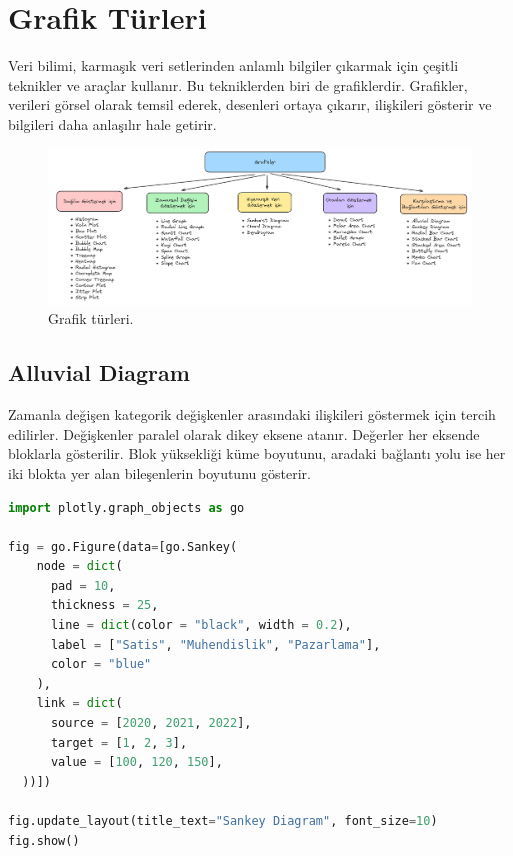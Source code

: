 \section{Grafik Türleri}
Veri bilimi, karmaşık veri setlerinden anlamlı bilgiler çıkarmak için çeşitli teknikler ve araçlar kullanır. Bu tekniklerden biri de grafiklerdir. Grafikler, verileri görsel olarak temsil ederek, desenleri ortaya çıkarır, ilişkileri gösterir ve bilgileri daha anlaşılır hale getirir.

\begin{figure}[h]
    \centering
    \includegraphics[width=1\textwidth]{images/graph_types.png}
    \caption{Grafik türleri.}
    \label{fig:enter-label}
\end{figure}

\newpage

\subsection{Alluvial Diagram}
Zamanla değişen kategorik değişkenler arasındaki ilişkileri göstermek için tercih edilirler. Değişkenler paralel olarak dikey eksene atanır. Değerler her eksende bloklarla gösterilir. Blok yüksekliği küme boyutunu, aradaki bağlantı yolu ise her iki blokta yer alan bileşenlerin boyutunu gösterir.

\begin{lstlisting}[language=Python]
import plotly.graph_objects as go

fig = go.Figure(data=[go.Sankey(
    node = dict(
      pad = 10,
      thickness = 25,
      line = dict(color = "black", width = 0.2),
      label = ["Satis", "Muhendislik", "Pazarlama"],
      color = "blue"
    ),
    link = dict(
      source = [2020, 2021, 2022],
      target = [1, 2, 3],
      value = [100, 120, 150],
  ))])

fig.update_layout(title_text="Sankey Diagram", font_size=10)
fig.show()
\end{lstlisting}

